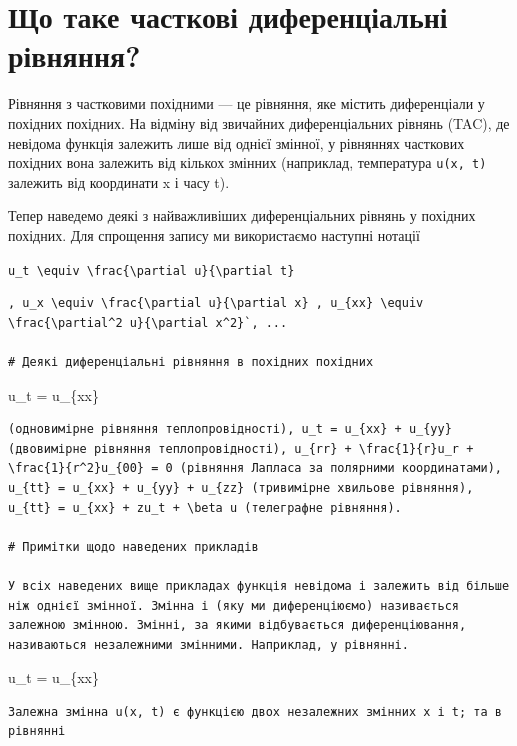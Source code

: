 \documentclass[
  ukrainian,
]{article}
\begin{document}
\section{Що таке часткові диференціальні
рівняння?}\label{ux449ux43e-ux442ux430ux43aux435-ux447ux430ux441ux442ux43aux43eux432ux456-ux434ux438ux444ux435ux440ux435ux43dux446ux456ux430ux43bux44cux43dux456-ux440ux456ux432ux43dux44fux43dux43dux44f}

Рівняння з частковими похідними --- це рівняння, яке містить
диференціали у похідних похідних. На відміну від звичайних
диференціальних рівнянь (TAC), де невідома функція залежить лише від
однієї змінної, у рівняннях часткових похідних вона залежить від кількох
змінних (наприклад, температура \texttt{u(x,\ t)} залежить від
координати x і часу t).

Тепер наведемо деякі з найважливіших диференціальних рівнянь у похідних
похідних. Для спрощення запису ми використаємо наступні нотації

\texttt{\textquotesingle{}u\_t\textquotesingle{}\ \textbackslash{}equiv\ \textbackslash{}frac\{\textbackslash{}partial\ u\}\{\textbackslash{}partial\ t\}}

\begin{verbatim}
, u_x \equiv \frac{\partial u}{\partial x} , u_{xx} \equiv \frac{\partial^2 u}{\partial x^2}`, ...

# Деякі диференціальні рівняння в похідних похідних
\end{verbatim}

u\_t = u\_\{xx\}

\begin{verbatim}
(одновимірне рівняння теплопровідності), u_t = u_{xx} + u_{yy} (двовимірне рівняння теплопровідності), u_{rr} + \frac{1}{r}u_r + \frac{1}{r^2}u_{00} = 0 (рівняння Лапласа за полярними координатами), u_{tt} = u_{xx} + u_{yy} + u_{zz} (тривимірне хвильове рівняння), u_{tt} = u_{xx} + zu_t + \beta u (телеграфне рівняння).

# Примітки щодо наведених прикладів

У всіх наведених вище прикладах функція невідома і залежить від більше ніж однієї змінної. Змінна і (яку ми диференціюємо) називається залежною змінною. Змінні, за якими відбувається диференціювання, називаються незалежними змінними. Наприклад, у рівнянні.
\end{verbatim}

u\_t = u\_\{xx\}

\begin{verbatim}
Залежна змінна u(x, t) є функцією двох незалежних змінних x і t; та в рівнянні
\end{verbatim}
\end{document}

